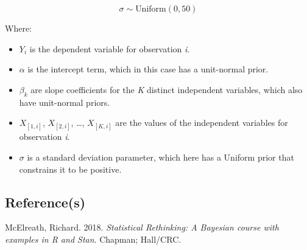 \documentclass[
  letterpaper,
  DIV=11,
  numbers=noendperiod]{scrartcl}
\newlength{\cslhangindent}
\newenvironment{CSLReferences}[2] %
 {\begin{list}{}{%
  \setlength{\itemindent}{0pt}
  \setlength{\leftmargin}{0pt}
  \setlength{\parsep}{0pt}
  \ifodd #1
   \setlength{\leftmargin}{\cslhangindent}
   \setlength{\itemindent}{-1\cslhangindent}
  \fi
  \setlength{\itemsep}{#2\baselineskip}}}
 {\end{list}}
\begin{document}
\[
σ \sim \text{Uniform}(0, 50)
\]

Where:

\begin{itemize}
\item
  \(Y_i\) is the dependent variable for observation \emph{i}.
\item
  \(\alpha\) is the intercept term, which in this case has a unit-normal
  prior.
\item
  \(\beta_k\) are slope coefficients for the \emph{K} distinct
  independent variables, which also have unit-normal priors.
\item
  \(X_{[1,i]}\), \(X_{[2,i]}\), \ldots, \(X_{[K,i]}\) are the values of
  the independent variables for observation \emph{i}.
\item
  \(\sigma\) is a standard deviation parameter, which here has a Uniform
  prior that constrains it to be positive.
\end{itemize}

\subsection{Reference(s)}\label{references}

\label{refs}
\begin{CSLReferences}{1}{0}
McElreath, Richard. 2018. \emph{{Statistical Rethinking: A Bayesian
course with examples in R and Stan}}. Chapman; Hall/CRC.

\end{CSLReferences}
\end{document}
